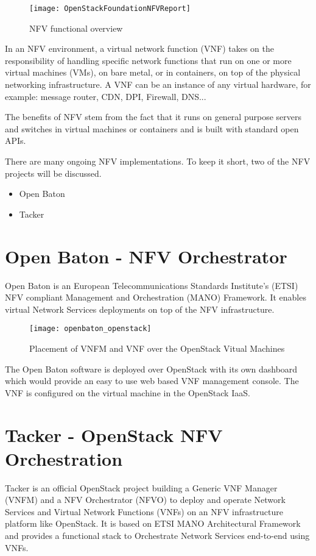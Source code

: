 \begin{figure}[H]
	\begin{center}
		\texttt{[image: OpenStackFoundationNFVReport]}
		\caption{NFV functional overview\cite{openstack_nfv}}
		\label{fig:OpenStackFoundationNFVReport}
	\end{center}
	\vspace{-10pt}
\end{figure}

In an NFV environment, a virtual network function (VNF) takes on the responsibility of handling specific network functions that run on one or more virtual machines (VMs), on bare metal, or in containers, on top of the physical networking infrastructure.
A VNF can be an instance of any virtual hardware, for example: message router, CDN, DPI, Firewall, DNS...

The benefits of NFV stem from the fact that it runs on general purpose servers and switches in virtual machines or containers and is built with standard open APIs.

There are many ongoing NFV implementations. To keep it short, two of the NFV projects will be discussed.
\begin{itemize}
	\item Open Baton
	\item Tacker
\end{itemize}

\section{Open Baton - NFV Orchestrator}\label{sec:openbaton}
Open Baton is an European Telecommunications Standards Institute's (ETSI) NFV compliant Management and Orchestration (MANO) Framework.
It enables virtual Network Services deployments on top of the NFV infrastructure.

\begin{figure}[H]
	\begin{center}
		\texttt{[image: openbaton\_openstack]}
		\caption{Placement of VNFM and VNF over the OpenStack Vitual Machines\cite{openBatonFeatures}}
		\label{fig:openbaton_openstack}
	\end{center}
	\vspace{-10pt}
\end{figure}

The Open Baton software is deployed over OpenStack with its own dashboard which would provide an easy to use web based VNF management console.
The VNF is configured on the virtual machine in the OpenStack IaaS.


\section{Tacker - OpenStack NFV Orchestration}\label{sec:tacker}

Tacker is an official OpenStack project building a Generic VNF Manager (VNFM) and a NFV Orchestrator (NFVO) to deploy and operate Network Services and Virtual Network Functions (VNFs) on an NFV infrastructure platform like OpenStack. It is based on ETSI MANO Architectural Framework and provides a functional stack to Orchestrate Network Services end-to-end using VNFs.

